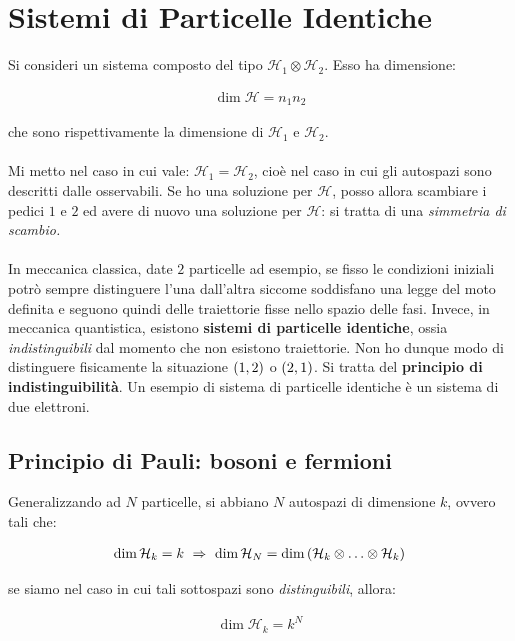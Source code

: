 \chapter{Sistemi di Particelle Identiche}

	Si consideri un sistema composto del tipo $\mathcal{H}_1 \otimes \mathcal{H}_2$. Esso ha dimensione:
	
\begin{align*}
	\dim \mathcal{H} = n_1 n_2
\end{align*}

	che sono rispettivamente la dimensione di $\mathcal{H}_1$ e $\mathcal{H}_2$.
	\\	
	\\
	Mi metto nel caso in cui vale: $\mathcal{H}_1 = \mathcal{H}_2$, cioè nel caso in cui gli autospazi sono descritti dalle osservabili. Se ho una soluzione per $\mathcal{H}$, posso allora scambiare i pedici $1$ e $2$ ed avere di nuovo una soluzione per $\mathcal{H}$: si tratta di una \textit{simmetria di scambio.}
	\\
	\\
	In meccanica classica, date $2$ particelle ad esempio, se fisso le condizioni iniziali potrò sempre distinguere l'una dall'altra siccome soddisfano una legge del moto definita e seguono quindi delle traiettorie fisse nello spazio delle fasi. Invece, in meccanica quantistica, esistono \textbf{sistemi di particelle identiche}, ossia \textit{indistinguibili} dal momento che non esistono traiettorie. Non ho dunque modo di distinguere fisicamente la situazione $\qty(1, 2)$ o $\qty(2, 1)$. Si tratta del \textbf{principio di indistinguibilità}. Un esempio di sistema di particelle identiche è un sistema di due elettroni.

\section{Principio di Pauli: bosoni e fermioni}

	Generalizzando ad $N$ particelle, si abbiano $N$ autospazi di dimensione $k$, ovvero tali che:

\begin{align*}	
	\dim \mathcal{H}_k = k \, \, \Rightarrow \, \, \dim \mathcal{H}_N = \dim \qty(\mathcal{H}_k \otimes \ldots \otimes \mathcal{H}_k)
\end{align*}

	se siamo nel caso in cui tali sottospazi sono \textit{distinguibili}, allora:
	
\begin{align*}
	\dim \mathcal{H}_k = k^N
\end{align*}

